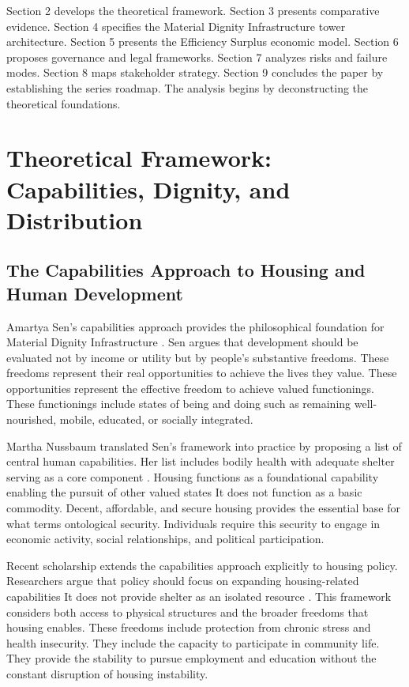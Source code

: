 \documentclass[12pt, letterpaper]{article}
\begin{document}
Section 2 develops the theoretical framework. Section 3 presents comparative evidence. Section 4 specifies the Material Dignity Infrastructure tower architecture. Section 5 presents the Efficiency Surplus economic model. Section 6 proposes governance and legal frameworks. Section 7 analyzes risks and failure modes. Section 8 maps stakeholder strategy. Section 9 concludes the paper by establishing the series roadmap. The analysis begins by deconstructing the theoretical foundations.

\newpage

\section{Theoretical Framework: Capabilities, Dignity, and Distribution}

\subsection{The Capabilities Approach to Housing and Human Development}

Amartya Sen's capabilities approach provides the philosophical foundation for Material Dignity Infrastructure \citep{sen_1999}. Sen argues that development should be evaluated not by income or utility but by people's substantive freedoms. These freedoms represent their real opportunities to achieve the lives they value. These opportunities represent the effective freedom to achieve valued functionings. These functionings include states of being and doing such as remaining well-nourished, mobile, educated, or socially integrated.

Martha Nussbaum translated Sen's framework into practice by proposing a list of central human capabilities. Her list includes bodily health with adequate shelter serving as a core component \citep{nussbaum_2011}. Housing functions as a foundational capability enabling the pursuit of other valued states It does not function as a basic commodity. Decent, affordable, and secure housing provides the essential base for what \citet{saunders_1989} terms ontological security. Individuals require this security to engage in economic activity, social relationships, and political participation.

Recent scholarship extends the capabilities approach explicitly to housing policy. Researchers argue that policy should focus on expanding housing-related capabilities It does not provide shelter as an isolated resource \citep{cambridge_2019}. This framework considers both access to physical structures and the broader freedoms that housing enables. These freedoms include protection from chronic stress and health insecurity. They include the capacity to participate in community life. They provide the stability to pursue employment and education without the constant disruption of housing instability.
\end{document}
